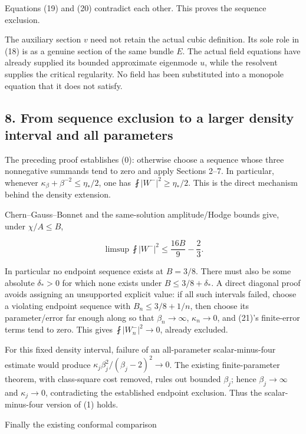 Equations (19) and (20) contradict each other. This proves the sequence
exclusion.

The auxiliary section \(v\) need not retain the actual cubic definition.
Its sole role in (18) is as a genuine section of the same bundle \(E\).
The actual field equations have already supplied its bounded approximate
eigenmode \(u\), while the resolvent supplies the critical regularity.
No field has been substituted into a monopole equation that it does not
satisfy.

\hypertarget{o10critical:from-sequence-exclusion-to-a-larger-density-interval-and-all-parameters}{%
\subsection{8. From sequence exclusion to a larger density interval and
all
parameters}\label{o10critical:from-sequence-exclusion-to-a-larger-density-interval-and-all-parameters}}

The preceding proof establishes (0): otherwise choose a sequence whose
three nonnegative summands tend to zero and apply Sections 2--7. In
particular, whenever \(\kappa_\beta+\beta^{-2}\le\eta_*/2\), one has
\(\fint|W^-|^2\ge\eta_*/2\). This is the direct mechanism behind the
density extension.

Chern--Gauss--Bonnet and the same-solution amplitude/Hodge bounds give,
under \(\chi/A\le B\),

\[
 \limsup\fint|W^-|^2\le\frac{16B}{9}-\frac23.
\tag{21}
\]

In particular no endpoint sequence exists at \(B=3/8\). There must also
be some absolute \(\delta_*>0\) for which none exists under
\(B\le3/8+\delta_*\). A direct diagonal proof avoids assigning an
unsupported explicit value: if all such intervals failed, choose a
violating endpoint sequence with \(B_n\le3/8+1/n\), then choose its
parameter/error far enough along so that \(\beta_n\to\infty\),
\(\kappa_n\to0\), and (21)'s finite-error terms tend to zero. This gives
\(\fint|W_n^-|^2\to0\), already excluded.

For this fixed density interval, failure of an all-parameter
scalar-minus-four estimate would produce
\(\kappa_j\beta_j^2/(\beta_j-2)^2\to0\). The existing finite-parameter
theorem, with class-square cost removed, rules out bounded \(\beta_j\);
hence \(\beta_j\to\infty\) and \(\kappa_j\to0\), contradicting the
established endpoint exclusion. Thus the scalar-minus-four version of
(1) holds.

Finally the existing conformal comparison

